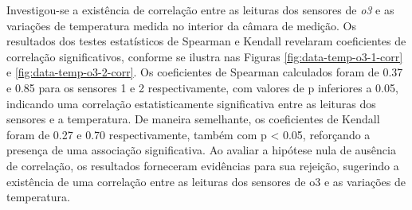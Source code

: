 Investigou-se a existência de correlação entre as leituras dos sensores de \textit{o3} e as variações de temperatura medida no interior da câmara de medição. Os resultados dos testes estatísticos de Spearman e Kendall revelaram coeficientes de correlação significativos, conforme se ilustra nas Figuras \ref{fig:data-temp-o3-1-corr} e \ref{fig:data-temp-o3-2-corr}. Os coeficientes de Spearman calculados foram de 0.37 e 0.85 para os sensores 1 e 2 respectivamente, com valores de p inferiores a 0.05, indicando uma correlação estatisticamente significativa entre as leituras dos sensores e a temperatura. De maneira semelhante, os coeficientes de Kendall foram de 0.27 e 0.70 respectivamente, também com p < 0.05, reforçando a presença de uma associação significativa. Ao avaliar a hipótese nula de ausência de correlação, os resultados forneceram evidências para sua rejeição, sugerindo a existência de uma correlação entre as leituras dos sensores de \acrshort{o3} e as variações de temperatura.


